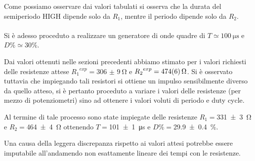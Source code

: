 	Come possiamo osservare dai valori tabulati si osserva che la durata del semiperiodo HIGH dipende solo da $R_1$, mentre il periodo dipende solo da $R_2$.

	\paragraph{}Si è adesso proceduto a realizzare un generatore di onde quadre di $T\simeq \SI{100}{\us} $ e $D \% \simeq 30 \% $.

	Dai valori ottenuti nelle sezioni precedenti abbiamo stimato per i valori richiesti delle resistenze attese ${R_{1}}^{exp}=\SI{306(9)}{\ohm}$ e ${R_{2}}^{exp}=\SI{474 \pm 6}{\ohm}$. %
	Si è osservato tuttavia che impiegando tali resistori si ottiene un impulso sensibilmente diverso da quello atteso, si è pertanto proceduto a variare i valori delle resistenze (per mezzo di potenziometri) sino ad ottenere i valori voluti di periodo e duty cycle.

	Al termine di tale processo sono state impiegate delle resistenze $R_{1}=$\SI{331 \pm 3}{\ohm} e $R_{2}=$\SI{464 \pm 4}{\ohm} ottenendo $T=$\SI{101 \pm 1}{\us} e $ D\%=$\SI{29.9 \pm 0.4}{\%}.

	Una causa della leggera discrepanza rispetto ai valori attesi potrebbe essere imputabile all'andamendo non esattamente lineare dei tempi con le resistenze.
